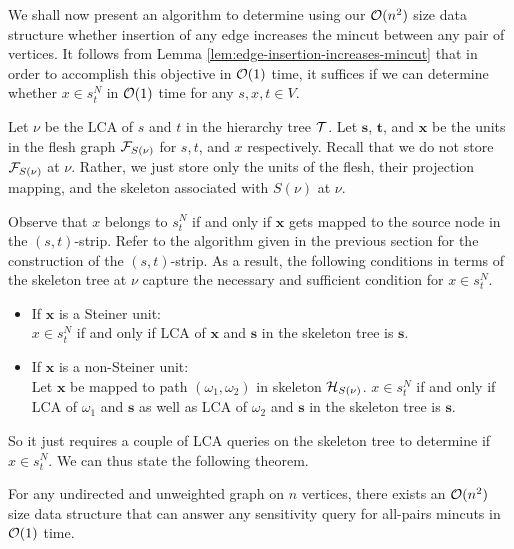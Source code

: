 We shall now present an algorithm 
to determine using our ${\cal O}(n^2)$ size data structure whether insertion of any edge increases the mincut between any pair of vertices. It follows from Lemma \ref{lem:edge-insertion-increases-mincut} that in order to accomplish this objective in ${\cal O}(1)$ time, it suffices if we can determine whether $x\in s^N_t$ in ${\cal O}(1)$ time for any $s,x,t\in V$. 

Let $\nu$ be the LCA of $s$ and $t$ in the hierarchy tree ${\cal T}$. Let ${\mathbf s}$,
${\mathbf t}$, and ${\mathbf x}$ be the units in the flesh graph ${\cal F}_{S(\nu)}$ for $s,t$, and $x$ respectively. Recall that we do not store ${\cal F}_{S(\nu)}$ at $\nu$. Rather, we just store only the units of the flesh, their projection mapping, and the skeleton associated with ${S(\nu)}$ at $\nu$.

Observe that $x$ belongs to $s^N_t$ if and only if ${\mathbf x}$ gets mapped to the source node in
the $(s,t)$-strip. Refer to the algorithm given in the previous section for the construction of the $(s,t)$-strip. As a result, the following conditions in terms of the skeleton tree at $\nu$ capture the necessary and sufficient condition for $x\in s^N_t$. 

\begin{itemize}
    \item If ${\mathbf x}$ is a Steiner unit:\\
    $x\in s^N_t$ if and only if LCA of ${\mathbf x}$
    and ${\mathbf s}$ in the skeleton tree is ${\mathbf s}$. 
    \item If ${\mathbf x}$ is a non-Steiner unit:\\
    Let ${\mathbf x}$ be mapped to path $(\omega_1,\omega_2)$ in skeleton ${\cal H}_{S(\nu)}$. 
    $x\in s^N_t$ if and only if LCA of $ {\omega_1}$
    and ${\mathbf s}$ as well as LCA of ${\omega_2}$
    and ${\mathbf s}$ in the skeleton tree is ${\mathbf s}$. 
\end{itemize}
So it just requires a couple of LCA queries on the skeleton tree to determine if $x\in s^N_t$.
We can thus state the following theorem.

\begin{theorem}
For any undirected and unweighted graph on $n$ vertices, there exists an ${\cal O}(n^2)$ size data structure that can answer 
any sensitivity query for all-pairs mincuts in ${\cal O}(1)$ time.
\end{theorem}







